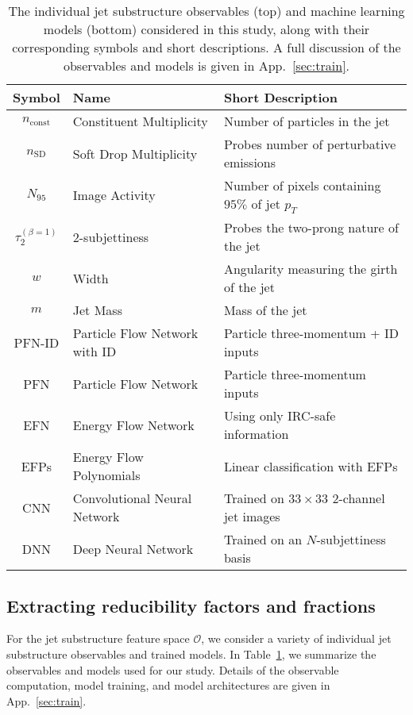 \documentclass[letterpaper,11pt]{article}
\DeclareRobustCommand{\App}[1]{App.~\ref{#1}}
\DeclareRobustCommand{\Tab}[1]{Table~\ref{#1}}
\begin{document}
\begin{table}[t]
\centering
\begin{tabular}{|c|l|l|}
\hline
 Symbol & Name &Short Description  \\ \hline \hline
$n_\text{const}$ & Constituent Multiplicity & Number of particles in the jet \\
$n_\text{SD}$ & Soft Drop Multiplicity & Probes number of perturbative emissions \\
$N_{95}$ & Image Activity & Number of pixels containing $95\%$ of jet $p_T$\\
$\tau_2^{(\beta=1)}$ & 2-subjettiness & Probes the two-prong nature of the jet\\
$w$ &  Width & Angularity measuring the girth of the jet\\
$m$ & Jet Mass & Mass of the jet\\
\hline \hline
PFN-ID & Particle Flow Network with ID & Particle three-momentum + ID inputs\\
PFN & Particle Flow Network & Particle three-momentum inputs \\
EFN & Energy Flow Network & Using only IRC-safe information\\
EFPs & Energy Flow Polynomials & Linear classification with EFPs\\
CNN & Convolutional Neural Network & Trained on $33\times 33$ 2-channel jet images\\
DNN & Deep Neural Network & Trained on an $N$-subjettiness basis \\
\hline
\end{tabular}
\caption{The individual jet substructure observables (top) and machine learning models (bottom) considered in this study, along with their corresponding symbols and short descriptions.
%
A full discussion of the observables and models is given in \App{sec:train}.}
\label{tab:obsandmodels}
\end{table}

\subsection{Extracting reducibility factors and fractions}
\label{sec:extract}

For the jet substructure feature space $\mathcal O$, we consider a variety of individual jet substructure observables and trained models.
%
In \Tab{tab:obsandmodels}, we summarize the observables and models used for our study.
%
Details of the observable computation, model training, and model architectures are given in \App{sec:train}.
\end{document}
